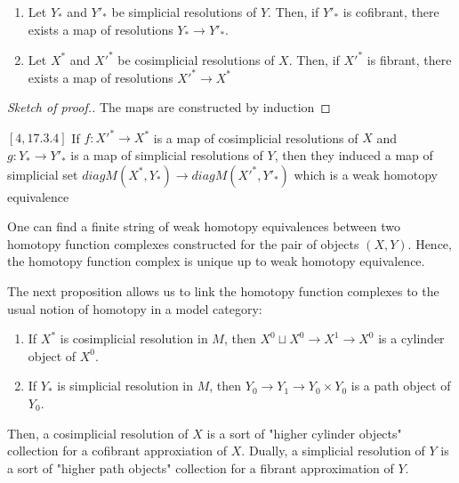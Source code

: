 \begin{refsection}
\begin{lemma}
\begin{enumerate}
\item Let $Y_*$ and $Y'_*$ be simplicial resolutions of $Y$. Then, if $Y'_*$ is cofibrant, there exists a map of resolutions $Y_* \rightarrow Y'_*$.
\item Let $X^*$ and $X'^*$ be cosimplicial resolutions of $X$. Then, if $X'^*$ is fibrant, there exists a map of resolutions $X'^* \rightarrow X^*$
\end{enumerate}
\end{lemma}

\begin{proof}[Sketch of proof.]
The maps are constructed by induction
\end{proof}

\begin{prop} $[4,17.3.4]$
If $f:{X'}^* \rightarrow X^*$ is a map of cosimplicial resolutions of $X$ and $g:Y_* \rightarrow {Y'}_*$ is a map of simplicial resolutions of $Y$, then they induced a map of simplicial set $diag M(X^*,Y_*) \rightarrow diag M({X'}^*,{Y'}_*)$ which is a weak homotopy equivalence
\end{prop}

\begin{cor}
One can find a finite string of weak homotopy equivalences between two homotopy function complexes constructed for the pair of objects $(X,Y)$. Hence, the homotopy function complex is unique up to weak homotopy equivalence.
\end{cor}

The next proposition allows us to link the homotopy function complexes to the usual notion of homotopy in a model category:

\begin{prop}
\begin{enumerate}
\item If $X^*$ is cosimplicial resolution in $M$, then $X^0 \sqcup X^0 \rightarrow X^1 \rightarrow X^0$ is a cylinder object of $X^0$.
\item If $Y_*$ is simplicial resolution in $M$, then $Y_0 \rightarrow Y_1 \rightarrow Y_0 \times Y_0$ is a path object of $Y_0$.
\end{enumerate}
\end{prop}

Then, a cosimplicial resolution of $X$ is a sort of "higher cylinder objects" collection for a cofibrant approxiation of $X$. Dually, a simplicial resolution of $Y$ is a sort of "higher path objects" collection for a fibrant approximation of $Y$.



\end{refsection}
